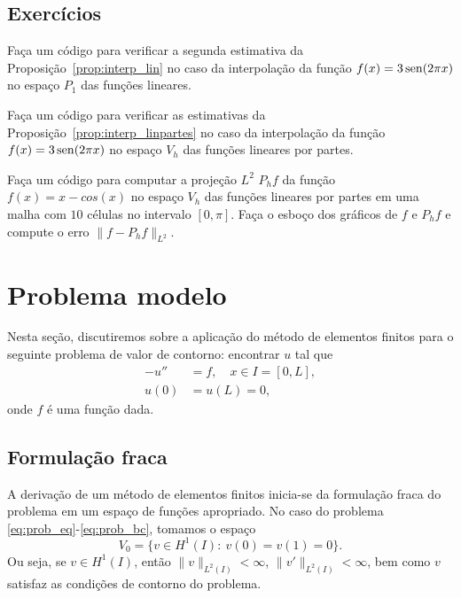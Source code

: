 \subsection*{Exercícios}

\begin{exer}
  Faça um código para verificar a segunda estimativa da Proposição~\ref{prop:interp_lin} no caso da interpolação da função $f(x) = 3\operatorname{sen}(2\pi x)$ no espaço $P_1$ das funções lineares.
\end{exer}


\begin{exer}
  Faça um código para verificar as estimativas da Proposição~\ref{prop:interp_linpartes} no caso da interpolação da função $f(x) = 3\operatorname{sen}(2\pi x)$ no espaço $V_h$ das funções lineares por partes.
\end{exer}

\begin{exer}
  Faça um código para computar a projeção $L^2$ $P_hf$ da função $f(x) = x - cos(x)$ no espaço $V_h$ das funções lineares por partes em uma malha com $10$ células no intervalo $[0, \pi]$. Faça o esboço dos gráficos de $f$ e $P_hf$ e compute o erro $\|f-P_hf\|_{L^2}$.
\end{exer}

\section{Problema modelo}\label{cap_mef1d_sec_modelo}

Nesta seção, discutiremos sobre a aplicação do método de elementos finitos para o seguinte problema de valor de contorno: encontrar $u$ tal que
\begin{align}
  -u'' &= f,\quad x\in I=[0,L],\label{eq:prob_eq}\\
  u(0) &= u(L) = 0,\label{eq:prob_bc}
\end{align}
onde $f$ é uma função dada.

\subsection{Formulação fraca}

A derivação de um método de elementos finitos inicia-se da formulação fraca do problema em um espaço de funções apropriado. No caso do problema \eqref{eq:prob_eq}-\eqref{eq:prob_bc}, tomamos o espaço
\begin{equation}
  V_0 = \{v\in H^1(I):~v(0)=v(1)=0\}.
\end{equation}
Ou seja, se $v\in H^1(I)$, então $\|v\|_{L^2(I)}<\infty$, $\|v'\|_{L^2(I)}<\infty$, bem como $v$ satisfaz as condições de contorno do problema.

